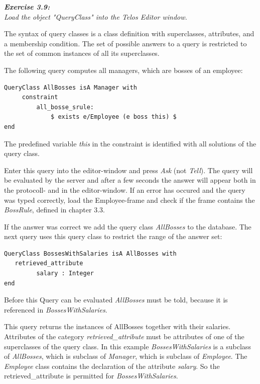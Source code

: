 \documentclass[10pt,a4paper]{article}
\begin{document}
\vspace{0.7cm}
{\it
{\bf Exercise 3.9:}\\
Load the object "QueryClass" into the Telos Editor window.
}

The syntax of query classes is a class definition with superclasses,
attributes, and a membership condition. The set of possible answers
to a query is restricted to the set of common instances of all its
superclasses.

The following query computes all managers, which are bosses of an
employee:

\begin{verbatim}
QueryClass AllBosses isA Manager with
     constraint
         all_bosse_srule:
             $ exists e/Employee (e boss this) $
end
\end{verbatim}

The predefined variable {\em this} in the constraint is identified
with all solutions of the query class.

Enter this query into the editor-window and press {\em Ask} (not {\em Tell}).
The query will be evaluated by the server and after a few seconds
the answer will appear both in the protocoll- and in the editor-window.
If an error has occured and the query was typed correctly, load the
Employee-frame and check if the frame contains the
{\em BossRule}, defined in chapter 3.3.

If the answer was correct we add the query class {\em AllBosses} to the
database. The next query uses this query class to restrict the range of
the answer set:

\begin{verbatim}
QueryClass BossesWithSalaries isA AllBosses with
   retrieved_attribute
         salary : Integer
end
\end{verbatim}

Before this Query can be evaluated {\em AllBosses} must be told, because
it is referenced in {\em BossesWithSalaries}.

This query returns the instances of AllBosses together with their salaries.
Attributes of the category {\em retrieved\_attribute} must be attributes of
one of the superclasses of the query class. In this example {\em BossesWithSalaries}
is a subclass of {\em AllBosses}, which is subclass of {\em Manager}, which is subclass of {\em Employee}.
The {\em Employee} class contains
the declaration of the attribute {\em salary}. So the retrieved\_attribute is permitted
for {\em BossesWithSalaries}. \\
\end{document}
